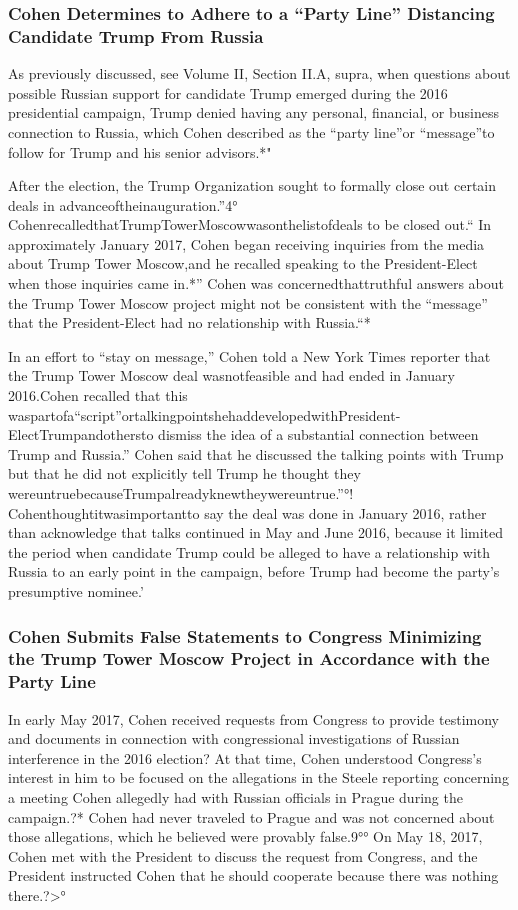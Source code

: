 \subsubsection{Cohen Determines to Adhere to a “Party Line” Distancing Candidate Trump From Russia}

As previously discussed, see Volume II, Section II.A, supra, when questions about possible Russian support for candidate Trump emerged during the 2016 presidential campaign, Trump denied having any personal, financial, or business connection to Russia, which Cohen described as the “party line”or “message”to follow for Trump and his senior advisors.*"

After the election, the Trump Organization sought to formally close out certain deals in advanceoftheinauguration.”4° CohenrecalledthatTrumpTowerMoscowwasonthelistofdeals to be closed out.“ In approximately January 2017, Cohen began receiving inquiries from the media about Trump Tower Moscow,and he recalled speaking to the President-Elect when those inquiries came in.*” Cohen was concernedthattruthful answers about the Trump Tower Moscow project might not be consistent with the “message” that the President-Elect had no relationship with Russia.“*

In an effort to “stay on message,” Cohen told a New York Times reporter that the Trump Tower Moscow deal wasnotfeasible and had ended in January 2016.Cohen recalled that this waspartofa“script”ortalkingpointshehaddevelopedwithPresident-ElectTrumpandothersto
dismiss the idea of a substantial connection between Trump and Russia.” Cohen said that he discussed the talking points with Trump but that he did not explicitly tell Trump he thought they wereuntruebecauseTrumpalreadyknewtheywereuntrue.”°! Cohenthoughtitwasimportantto say the deal was done in January 2016, rather than acknowledge that talks continued in May and June 2016, because it limited the period when candidate Trump could be alleged to have a relationship with Russia to an early point in the campaign, before Trump had become the party's presumptive nominee.'

\subsubsection{Cohen Submits False Statements to Congress Minimizing the Trump Tower Moscow Project in Accordance with the Party Line}

In early May 2017, Cohen received requests from Congress to provide testimony and documents in connection with congressional investigations of Russian interference in the 2016 election? At that time, Cohen understood Congress's interest in him to be focused on the allegations in the Steele reporting concerning a meeting Cohen allegedly had with Russian officials in Prague during the campaign.?* Cohen had never traveled to Prague and was not concerned about those allegations, which he believed were provably false.9°° On May 18, 2017, Cohen met with the President to discuss the request from Congress, and the President instructed Cohen that he should cooperate because there was nothing there.?>°

